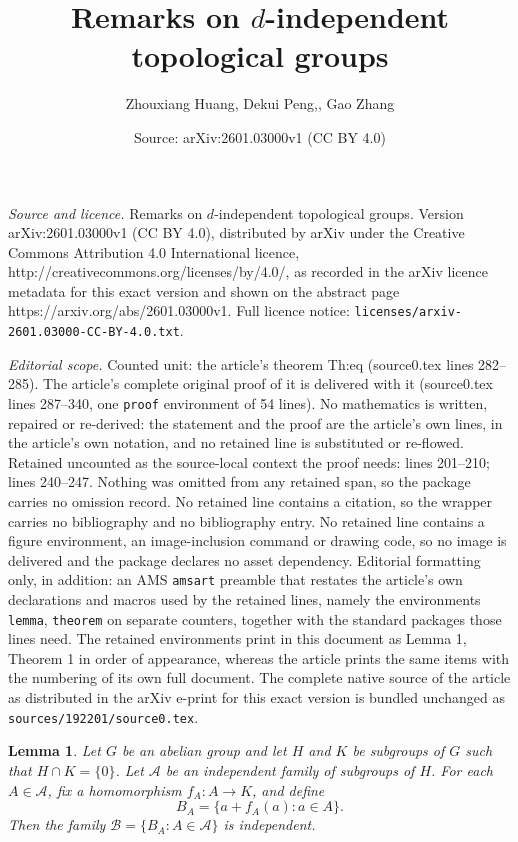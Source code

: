 \documentclass[10pt,a4paper]{amsart}
\title{Remarks on $d$-independent topological groups}
\author{Zhouxiang Huang, Dekui Peng,, Gao Zhang}
\date{Source: arXiv:2601.03000v1 (CC BY 4.0)}
\newtheorem{lemma}{Lemma}
\begin{document}
\maketitle

\noindent\emph{Source and licence.} Remarks on $d$-independent topological groups. Version arXiv:2601.03000v1 (CC BY 4.0), distributed by arXiv under the Creative Commons Attribution 4.0 International licence, http://creativecommons.org/licenses/by/4.0/, as recorded in the arXiv licence metadata for this exact version and shown on the abstract page https://arxiv.org/abs/2601.03000v1. Full licence notice: \texttt{licenses/arxiv-2601.03000-CC-BY-4.0.txt}.\par\smallskip

\noindent\textit{Editorial scope.} Counted unit: the article's theorem Th:eq (source0.tex lines 282--285). The article's complete original proof of it is delivered with it (source0.tex lines 287--340, one \texttt{proof} environment of 54 lines). No mathematics is written, repaired or re-derived: the statement and the proof are the article's own lines, in the article's own notation, and no retained line is substituted or re-flowed.  Retained uncounted as the source-local context the proof needs: lines 201--210; lines 240--247.  Nothing was omitted from any retained span, so the package carries no omission record.  No retained line contains a citation, so the wrapper carries no bibliography and no bibliography entry.  No retained line contains a figure environment, an image-inclusion command or drawing code, so no image is delivered and the package declares no asset dependency.  Editorial formatting only, in addition: an AMS \texttt{amsart} preamble that restates the article's own declarations and macros used by the retained lines, namely the environments \texttt{lemma}, \texttt{theorem} on separate counters, together with the standard packages those lines need.  The retained environments print in this document as Lemma 1, Theorem 1 in order of appearance, whereas the article prints the same items with the numbering of its own full document.  The complete native source of the article as distributed in the arXiv e-print for this exact version is bundled unchanged as \texttt{sources/192201/source0.tex}.
\begin{lemma}\label{indfam}
Let $G$ be an abelian group and let $H$ and $K$ be subgroups of $G$ such that
$H\cap K=\{0\}$.
Let $\mathcal{A}$ be an independent family of subgroups of $H$.
For each $A\in \mathcal{A}$, fix a homomorphism $f_A\colon A\to K$, and define
\[
B_A=\{a+f_A(a): a\in A\}.
\]
Then the family $\mathcal{B}=\{B_A: A\in \mathcal{A}\}$ is independent.
\end{lemma}
\end{document}
